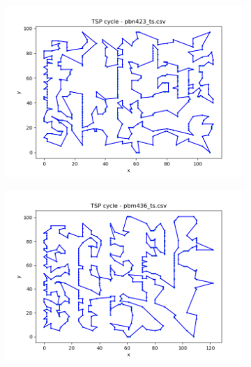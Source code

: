 \documentclass[12pt]{article}
\begin{document}
\begin{figure}[htpb]
\begin{subfigure}[b]{0.475\textwidth}
            \end{subfigure}
            \hfill
            \begin{subfigure}[b]{0.475\textwidth}
                \includegraphics[width=\linewidth]{img/pbn423_ts.png}
            \end{subfigure}
            \centering
            \begin{subfigure}[b]{0.475\textwidth}
                \includegraphics[width=\linewidth]{img/pbm436_ts.png}
            \end{subfigure}
            \hfill
            \begin{subfigure}[b]{0.475\textwidth}

\end{subfigure}
\end{figure}
\end{document}

